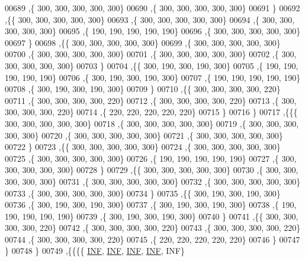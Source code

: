 \begin{DoxyCode}
00689    ,\{   300,   300,   300,   300,   300\}
00690    ,\{   300,   300,   300,   300,   300\}
00691    \}
00692   ,\{\{   300,   300,   300,   300,   300\}
00693    ,\{   300,   300,   300,   300,   300\}
00694    ,\{   300,   300,   300,   300,   300\}
00695    ,\{   190,   190,   190,   190,   190\}
00696    ,\{   300,   300,   300,   300,   300\}
00697    \}
00698   ,\{\{   300,   300,   300,   300,   300\}
00699    ,\{   300,   300,   300,   300,   300\}
00700    ,\{   300,   300,   300,   300,   300\}
00701    ,\{   300,   300,   300,   300,   300\}
00702    ,\{   300,   300,   300,   300,   300\}
00703    \}
00704   ,\{\{   300,   190,   300,   190,   300\}
00705    ,\{   190,   190,   190,   190,   190\}
00706    ,\{   300,   190,   300,   190,   300\}
00707    ,\{   190,   190,   190,   190,   190\}
00708    ,\{   300,   190,   300,   190,   300\}
00709    \}
00710   ,\{\{   300,   300,   300,   300,   220\}
00711    ,\{   300,   300,   300,   300,   220\}
00712    ,\{   300,   300,   300,   300,   220\}
00713    ,\{   300,   300,   300,   300,   220\}
00714    ,\{   220,   220,   220,   220,   220\}
00715    \}
00716   \}
00717  ,\{\{\{   300,   300,   300,   300,   300\}
00718    ,\{   300,   300,   300,   300,   300\}
00719    ,\{   300,   300,   300,   300,   300\}
00720    ,\{   300,   300,   300,   300,   300\}
00721    ,\{   300,   300,   300,   300,   300\}
00722    \}
00723   ,\{\{   300,   300,   300,   300,   300\}
00724    ,\{   300,   300,   300,   300,   300\}
00725    ,\{   300,   300,   300,   300,   300\}
00726    ,\{   190,   190,   190,   190,   190\}
00727    ,\{   300,   300,   300,   300,   300\}
00728    \}
00729   ,\{\{   300,   300,   300,   300,   300\}
00730    ,\{   300,   300,   300,   300,   300\}
00731    ,\{   300,   300,   300,   300,   300\}
00732    ,\{   300,   300,   300,   300,   300\}
00733    ,\{   300,   300,   300,   300,   300\}
00734    \}
00735   ,\{\{   300,   190,   300,   190,   300\}
00736    ,\{   300,   190,   300,   190,   300\}
00737    ,\{   300,   190,   300,   190,   300\}
00738    ,\{   190,   190,   190,   190,   190\}
00739    ,\{   300,   190,   300,   190,   300\}
00740    \}
00741   ,\{\{   300,   300,   300,   300,   220\}
00742    ,\{   300,   300,   300,   300,   220\}
00743    ,\{   300,   300,   300,   300,   220\}
00744    ,\{   300,   300,   300,   300,   220\}
00745    ,\{   220,   220,   220,   220,   220\}
00746    \}
00747   \}
00748  \}
00749 ,\{\{\{\{   \hyperlink{constants_8h_a12c2040f25d8e3a7b9e1c2024c618cb6}{INF},   \hyperlink{constants_8h_a12c2040f25d8e3a7b9e1c2024c618cb6}{INF},   \hyperlink{constants_8h_a12c2040f25d8e3a7b9e1c2024c618cb6}{INF},   \hyperlink{constants_8h_a12c2040f25d8e3a7b9e1c2024c618cb6}{INF},   INF\}

\end{DoxyCode}
